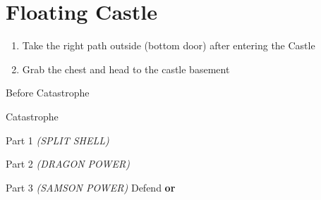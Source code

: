 \chapter{Floating Castle}

\vspace{\baselineskip}

\begin{paracol}{2}

\vspace{-0.045cm}
\begin{enumerate}
    \item Take the right path outside (bottom door) after entering the Castle
    \item Grab the  chest and head to the castle basement
\end{enumerate}

\begin{menu}{Before Catastrophe}
    \varwb
    \begin{equipMenu}
        \faris \optimize
    \end{equipMenu}
    \varwe
\end{menu}

\begin{boss}{Catastrophe}
    \varwb
    \begin{bossPart}{Part 1}
        \bartz[\bossHl{(1x)}] \rightCommand{\combine} \then \battleGroup{\antidote \space + \turtleShell} \textit{(SPLIT SHELL)} \then {}
        \faris[\bossHl{(1x)}] \leftCommand{\drink} \then \heroDrink
    \end{bossPart}
    \begin{bossPart}{Part 2}
        \cara[\bossHl{(1x)}] \rightCommand{\gilToss}
        \bartz[\bossHl{(1x)}] \rightCommand{\combine} \then \battleGroup{\potion \space + \dragonFang} \textit{(DRAGON POWER)} \then {}
        \lenna[\bossHl{(1x)}] \rightCommand{\dimenAbility} \then \float \space \then {}
    \end{bossPart}
    \begin{bossPart}{Part 3}
        \faris[\bossHl{(3x)}] \rightCommand{\gilToss}
        \bartz[\bossHl{(2x)}] \rightCommand{\combine} \then \battleGroup{\revivify \space + \antidote} \textit{(SAMSON POWER)} \then {}
        \cara[\bossHl{(1x)}] \rightCommand{\gilToss}
        \lenna[\bossHl{(1x)}] Defend \textbf{or} \rightCommand{\dimenAbility} \then \float \space \then {}
    \end{bossPart}
    \varwe
\end{boss}


\end{paracol}
